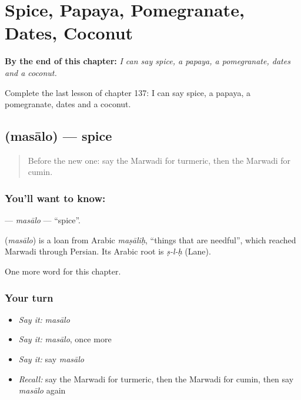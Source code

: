 
\chapter{Spice, Papaya, Pomegranate, Dates, Coconut}
\label{ch:mw-spice-papaya-pomegranate-dates-coconut}

\begin{chapteropening}
\textbf{By the end of this chapter:} \emph{I can say spice, a papaya, a pomegranate, dates and a coconut.}

Complete the last lesson of chapter 137: I can say spice, a papaya, a pomegranate, dates and a coconut.
\end{chapteropening}

\section[\texorpdfstring{\mw{मसालो} (masālo)}{मसालो (masālo)}]{ (masālo) — spice}

\label{lesson:MW-C137-masalo}



\begin{quote}
Before the new one: say the Marwadi for turmeric, then the Marwadi for cumin.
\end{quote}

\subsection*{You'll want to know: }
\textbf{} — \emph{masālo} — \textquotedblleft{}spice\textquotedblright{}.

\begin{cousinweb}
\textbf{} (\emph{masālo}) is a loan from Arabic \emph{maṣāliḥ}, \textquotedblleft{}things that are needful\textquotedblright{}, which reached Marwadi through Persian. Its Arabic root is \emph{ṣ-l-ḥ} (Lane).
\end{cousinweb}

\begin{grammarlens}[title={What you've built}]
One more word for this chapter.
\end{grammarlens}

\subsection*{Your turn}
\begin{itemize}
\raggedright
  \item \emph{Say it:} \emph{masālo}
  \item \emph{Say it:} \emph{masālo}, once more
  \item \emph{Say it:} say \emph{masālo}
  \item \emph{Recall:} say the Marwadi for turmeric, then the Marwadi for cumin, then say \emph{masālo} again
\end{itemize}

